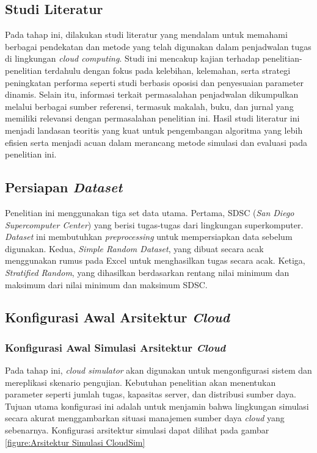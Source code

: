 \subsection{Studi Literatur}
Pada tahap ini, dilakukan studi literatur yang mendalam untuk memahami berbagai pendekatan dan metode yang telah digunakan dalam penjadwalan tugas di lingkungan \textit{cloud computing}. Studi ini mencakup kajian terhadap penelitian-penelitian terdahulu dengan fokus pada kelebihan, kelemahan, serta strategi peningkatan performa seperti studi berbasis oposisi dan penyesuaian parameter dinamis. Selain itu, informasi terkait permasalahan penjadwalan dikumpulkan melalui berbagai sumber referensi, termasuk makalah, buku, dan jurnal yang memiliki relevansi dengan permasalahan penelitian ini. Hasil studi literatur ini menjadi landasan teoritis yang kuat untuk pengembangan algoritma yang lebih efisien serta menjadi acuan dalam merancang metode simulasi dan evaluasi pada penelitian ini.

\subsection{Persiapan \textit{Dataset}}
Penelitian ini menggunakan tiga set data utama. Pertama, SDSC (\textit{San Diego Supercomputer Center}) yang berisi tugas-tugas dari lingkungan superkomputer. \textit{Dataset} ini membutuhkan \textit{preprocessing} untuk mempersiapkan data sebelum digunakan. Kedua, \textit{Simple Random
Dataset}, yang dibuat secara acak menggunakan rumus pada Excel untuk menghasilkan tugas secara acak. Ketiga, \textit{Stratified Random}, yang dihasilkan berdasarkan rentang nilai minimum dan maksimum dari nilai minimum dan maksimum SDSC.

\subsection{Konfigurasi Awal Arsitektur \textit{Cloud}}
\subsubsection{Konfigurasi Awal Simulasi Arsitektur \textit{Cloud}}
Pada tahap ini, \textit{cloud simulator} akan digunakan untuk mengonfigurasi sistem dan mereplikasi skenario pengujian. Kebutuhan penelitian akan menentukan parameter seperti jumlah tugas, kapasitas server, dan distribusi sumber daya. Tujuan utama konfigurasi ini adalah untuk menjamin bahwa lingkungan simulasi secara akurat menggambarkan situasi manajemen sumber daya \textit{cloud} yang sebenarnya. Konfigurasi arsitektur simulasi dapat dilihat pada gambar \ref{figure:Arsitektur Simulasi CloudSim}

